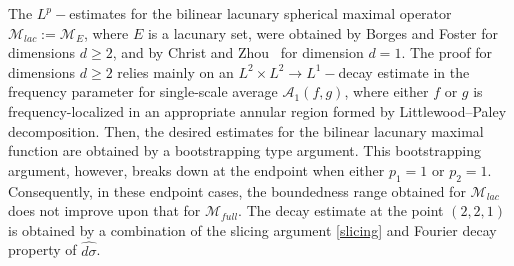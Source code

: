 \documentclass[a4paper,reqno]{amsart}
\numberwithin{equation}{section}
\begin{document}
	The $L^p-$estimates for the bilinear lacunary spherical maximal operator $\mathcal{M}_{lac}:=\mathcal{M}_E$, where $E$ is a lacunary set, were obtained by Borges and Foster \cite{BorgesFoster} for dimensions $d\geq 2$, and by Christ and Zhou~ \cite{ChristZhou} for dimension $d=1$. The proof for dimensions $d\geq 2$ relies mainly on an $L^2\times L^2\rightarrow L^1-$decay estimate in the frequency parameter for single-scale average $\mathcal{A}_1(f,g)$, where either $f$ or $g$ is frequency-localized in an appropriate annular region formed by Littlewood--Paley decomposition. Then, the desired estimates for the bilinear lacunary maximal function are obtained by a bootstrapping type argument. This bootstrapping argument, however, breaks down at the endpoint when either $p_1=1$ or $p_2=1$. Consequently, in these endpoint cases, the boundedness range obtained for $\mathcal{M}_{lac}$ does not improve upon that for $\mathcal{M}_{full}$. The decay estimate at the point $(2,2,1)$ is obtained by a combination of the slicing argument \eqref{slicing} and Fourier decay property of $\widehat{d\sigma}$.
	
\end{document}
